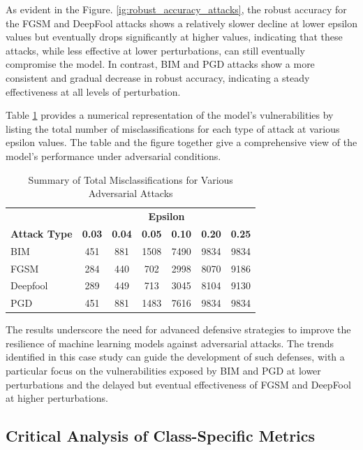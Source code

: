 \documentclass[10pt, conference, a4paper, final]{IEEEtran}
\begin{document}
As evident in the Figure. \ref{ig:robust_accuracy_attacks}, the robust accuracy for the FGSM and DeepFool attacks shows a relatively slower decline at lower epsilon values but eventually drops significantly at higher values, indicating that these attacks, while less effective at lower perturbations, can still eventually compromise the model. In contrast, BIM and PGD attacks show a more consistent and gradual decrease in robust accuracy, indicating a steady effectiveness at all levels of perturbation.

Table \ref{tab:misclassifications} provides a numerical representation of the model's vulnerabilities by listing the total number of misclassifications for each type of attack at various epsilon values. The table and the figure together give a comprehensive view of the model's performance under adversarial conditions.

\begin{table}[ht]
    \centering
    \caption{Summary of Total Misclassifications for Various Adversarial Attacks}
    \label{tab:misclassifications}
    \begin{tabular}{|l|c|c|c|c|c|c|}
    \hline
    & \multicolumn{6}{c|}{\textbf{Epsilon}} \\ \cline{2-7} 
    \multirow{-2}{*}{\textbf{Attack Type}} & \textbf{0.03} & \textbf{0.04} & \textbf{0.05} & \textbf{0.10} & \textbf{0.20} & \textbf{0.25} \\ \hline
    BIM & 451 & 881 & 1508 & 7490 & 9834 & 9834 \\ \hline
    FGSM & 284 & 440 & 702 & 2998 & 8070 & 9186 \\ \hline
    Deepfool & 289 & 449 & 713 & 3045 & 8104 & 9130 \\ \hline
    PGD & 451 & 881 & 1483 & 7616 & 9834 & 9834 \\ \hline
    \end{tabular}
\end{table}

The results underscore the need for advanced defensive strategies to improve the resilience of machine learning models against adversarial attacks. The trends identified in this case study can guide the development of such defenses, with a particular focus on the vulnerabilities exposed by BIM and PGD at lower perturbations and the delayed but eventual effectiveness of FGSM and DeepFool at higher perturbations.
\subsection{Critical Analysis of Class-Specific Metrics}
\end{document}
